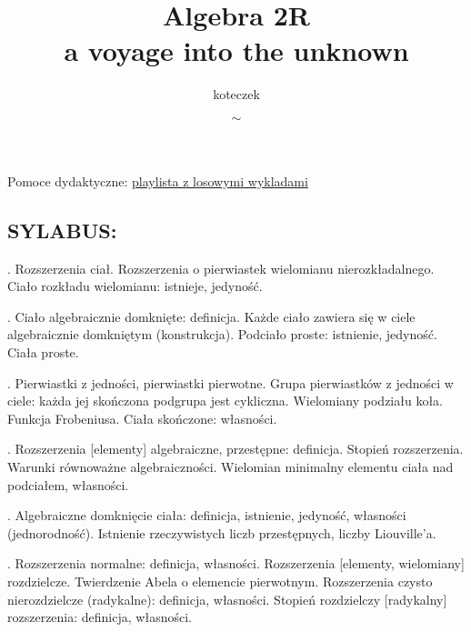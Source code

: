 \documentclass{article}
\title{Algebra 2R\smallskip\\{\scriptsize a voyage into the unknown}}
\author{koteczek}
\date{$\sim$}
\begin{document}
\maketitle

Pomoce dydaktyczne:
\href{https://www.youtube.com/playlist?list=PL8yHsr3EFj53Zxu3iRGMYL_89GDMvdkgt}{playlista z losowymi wykladami}

\subsection*{SYLABUS:}


. Rozszerzenia ciał. Rozszerzenia o pierwiastek wielomianu nierozkładalnego. Ciało rozkładu wielomianu: istnieje, jedyność.

. Ciało algebraicznie domknięte: definicja. Każde ciało zawiera się w ciele algebraicznie domkniętym (konstrukcja). Podciało proste: istnienie, jedyność. Ciała proste.

. Pierwiastki z jedności, pierwiastki pierwotne. Grupa pierwiastków z jedności w ciele: każda jej skończona podgrupa jest cykliczna. Wielomiany podziału koła. Funkcja Frobeniusa. Ciała skończone: własności.
\smallskip


. Rozszerzenia [elementy] algebraiczne, przestępne: definicja. Stopień rozszerzenia. Warunki równoważne algebraiczności. Wielomian minimalny elementu ciała nad podciałem, własności.

. Algebraiczne domknięcie ciała: definicja, istnienie, jedyność, własności (jednorodność). Istnienie rzeczywistych liczb przestępnych, liczby Liouville'a.

. Rozszerzenia normalne: definicja, własności. Rozszerzenia [elementy, wielomiany] rozdzielcze. Twierdzenie Abela o elemencie pierwotnym. Rozszerzenia czysto nierozdzielcze (radykalne): definicja, własności. Stopień rozdzielczy [radykalny] rozszerzenia: definicja, własności.

\newpage

\tableofcontents

\newpage



\newpage


\end{document}
